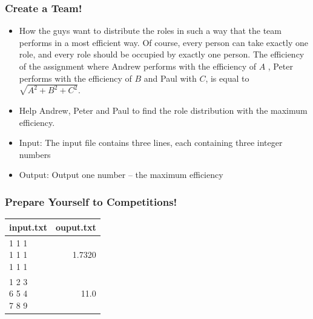 \begin{frame}[fragile]\frametitle{Create a Team!}
\begin{itemize}
\item  How the guys want to distribute the roles in such a way that the team performs in a most efficient way. Of course, every person can take exactly one role, and every role should be occupied by exactly one person. The efficiency of the assignment where Andrew performs with the efficiency of $A$ , Peter performs with the efficiency of $B$ and Paul with $C$, is equal to $\sqrt{A^2 + B^2 + C^2}$.
\item Help Andrew, Peter and Paul to find the role distribution with the maximum efficiency.
\item Input: The input file contains three lines, each containing three integer numbers 
\item Output: Output one number – the maximum efficiency
\end{itemize}
\end{frame}
\begin{frame}[fragile]\frametitle{Prepare Yourself to Competitions!}

\begin{table}[h!]
    \begin{tabular}{|l|r|}
	\hline
      input.txt & ouput.txt\\
      \hline
		\makecell[l]{
		1 1 1\\
		1 1 1\\
		1 1 1} & 1.7320\\ \hline
		\makecell[l]{
		1 2 3\\
		6 5 4\\
		7 8 9} & 11.0\\		
	  \hline
    \end{tabular}
\end{table}
\end{frame}


